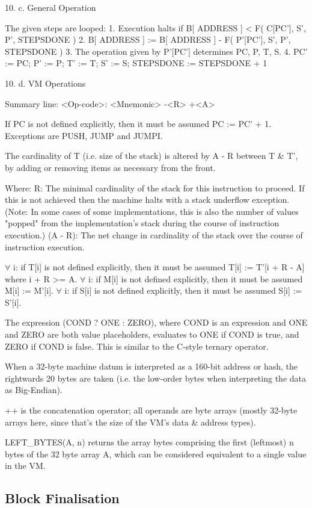\documentclass[9pt,oneside]{amsart}
\begin{document}
\begin{multicols}{2}
10. c. General Operation

The given steps are looped:
1. Execution halts if B[ ADDRESS ] < F( C[PC'], S', P', STEPSDONE )
2. B[ ADDRESS ] := B[ ADDRESS ] - F( P'[PC'], S', P', STEPSDONE )
3. The operation given by P'[PC'] determines PC, P, T, S.
4. PC' := PC; P' := P; T' := T; S' := S; STEPSDONE := STEPSDONE + 1


10. d. VM Operations

Summary line:
<Op-code>: <Mnemonic> -<R> +<A>

If PC is not defined explicitly, then it must be assumed PC := PC' + 1. Exceptions are PUSH, JUMP and JUMPI.

The cardinality of T (i.e. size of the stack) is altered by A - R between T \& T', by adding or removing items as necessary from the front.

Where:
R: The minimal cardinality of the stack for this instruction to proceed. If this is not achieved then the machine halts with a stack underflow exception. (Note: In some cases of some implementations, this is also the number of values "popped" from the implementation's stack during the course of instruction execution.)
(A - R): The net change in cardinality of the stack over the course of instruction execution.

$\forall$ i: if T[i] is not defined explicitly, then it must be assumed T[i] := T'[i + R - A] where i + R >= A.
$\forall$ i: if M[i] is not defined explicitly, then it must be assumed M[i] := M'[i].
$\forall$ i: if S[i] is not defined explicitly, then it must be assumed S[i] := S'[i].

The expression (COND ? ONE : ZERO), where COND is an expression and ONE and ZERO are both value placeholders, evaluates to ONE if COND is true, and ZERO if COND is false. This is similar to the C-style ternary operator.

When a 32-byte machine datum is interpreted as a 160-bit address or hash, the rightwards 20 bytes are taken (i.e. the low-order bytes when interpreting the data as Big-Endian).

++ is the concatenation operator; all operands are byte arrays (mostly 32-byte arrays here, since that's the size of the VM's data \& address types).

LEFT\_BYTES(A, n) returns the array bytes comprising the first (leftmost) n bytes of the 32 byte array A, which can be considered equivalent to a single value in the VM.



\subsection{Block Finalisation} \label{ch:finalisation}


\end{multicols}
\end{document}
